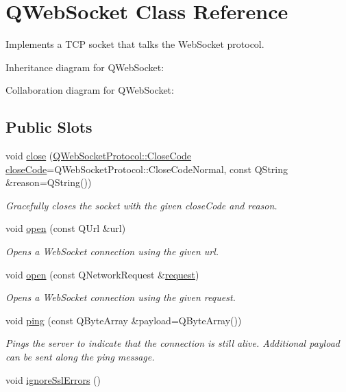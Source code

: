 \hypertarget{class_q_web_socket}{}\section{Q\+Web\+Socket Class Reference}
\label{class_q_web_socket}


Implements a T\+CP socket that talks the Web\+Socket protocol.  




Inheritance diagram for Q\+Web\+Socket\+:


Collaboration diagram for Q\+Web\+Socket\+:
\subsection*{Public Slots}
\begin{DoxyCompactItemize}
\item 
void \mbox{\hyperlink{class_q_web_socket_ae1c9af16e7f53666ccd423864b8e2c35}{close}} (\mbox{\hyperlink{namespace_q_web_socket_protocol_a9f236676f594451d8d723f260b71028c}{Q\+Web\+Socket\+Protocol\+::\+Close\+Code}} \mbox{\hyperlink{class_q_web_socket_ac0392e28fa81d5452868813d5e907d71}{close\+Code}}=Q\+Web\+Socket\+Protocol\+::\+Close\+Code\+Normal, const Q\+String \&reason=Q\+String())
\begin{DoxyCompactList}\small\item\em Gracefully closes the socket with the given {\itshape close\+Code} and {\itshape reason}. \end{DoxyCompactList}\item 
void \mbox{\hyperlink{class_q_web_socket_ac0351c89316b6914a58bc2f5c8ed9e6b}{open}} (const Q\+Url \&url)
\begin{DoxyCompactList}\small\item\em Opens a Web\+Socket connection using the given {\itshape url}. \end{DoxyCompactList}\item 
void \mbox{\hyperlink{class_q_web_socket_a7f321a0eb76101df28f9f3ebefa0ee3d}{open}} (const Q\+Network\+Request \&\mbox{\hyperlink{class_q_web_socket_a17b0d131ad2e4a0140f5faf23d30335c}{request}})
\begin{DoxyCompactList}\small\item\em Opens a Web\+Socket connection using the given {\itshape request}. \end{DoxyCompactList}\item 
void \mbox{\hyperlink{class_q_web_socket_add33f933cd9ceffdc03d6b3c6e948d89}{ping}} (const Q\+Byte\+Array \&payload=Q\+Byte\+Array())
\begin{DoxyCompactList}\small\item\em Pings the server to indicate that the connection is still alive. Additional {\itshape payload} can be sent along the ping message. \end{DoxyCompactList}\item 
void \mbox{\hyperlink{class_q_web_socket_aed580d710b6613a6218a78f4c07fb856}{ignore\+Ssl\+Errors}} ()
\end{DoxyCompactItemize}
